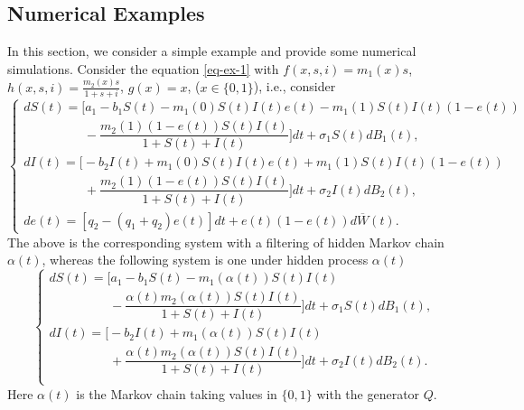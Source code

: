 \documentclass[12pt]{amsart}
\theoremstyle{remark}
\numberwithin{equation}{section}
\numberwithin{equation}{section}
\newcommand{\1}{\boldsymbol{1}}
\def\bar{\overline}
\begin{document}
\subsection{Numerical Examples}\label{sec:num}
In this section, we consider a simple example and provide some numerical simulations.
Consider the equation \eqref{eq-ex-1} with $f(x,s,i)=m_1(x)s$,
 $h(x,s,i)=\frac{m_2(x)s}{1+s+i}$, $g(x)=x$, ($x\in\{0,1\}$), i.e., consider
\begin{equation}\label{eq-ex-2}
\begin{cases}
dS(t)=\Big[a_1-b_1S(t)-m_1(0)S(t)I(t)e(t)-m_1(1)S(t)I(t)(1-e(t))
\\
\hspace{2cm}-\dfrac{m_2(1)(1-e(t))S(t)I(t)}{1+S(t)+I(t)}\Big]dt + \sigma_1 S(t) dB_1(t),\\[2ex]
dI(t)=\Big[-b_2I(t) + m_1(0)S(t)I(t)e(t)+m_1(1)S(t)I(t)(1-e(t))\\
\hspace{2cm}+\dfrac{m_2(1)(1-e(t))S(t)I(t)}{1+S(t)+I(t)}\Big]dt + \sigma_2I(t) dB_2(t),\\
de(t)=[q_2-(q_1+q_2)e(t)]dt+e(t)(1-e(t))d\bar W(t).
\end{cases}
\end{equation}
The above is the corresponding system
with a filtering of hidden Markov chain $\alpha(t)$, whereas
the following
system is one under hidden process $\alpha(t)$
\begin{equation}\label{eq-ex-3}
\begin{cases}
dS(t)=\Big[a_1-b_1S(t)-m_1(\alpha(t))S(t)I(t)\\
\hspace{2cm}-\dfrac{\alpha(t)m_2(\alpha(t))S(t)I(t)}{1+S(t)+I(t)}\Big]dt + \sigma_1 S(t) dB_1(t),\\[2ex]
dI(t)=\Big[-b_2I(t) + m_1(\alpha(t))S(t)I(t)\\
\hspace{2cm}+\dfrac{\alpha(t)m_2(\alpha(t))S(t)I(t)}{1+S(t)+I(t)}\Big]dt + \sigma_2I(t) dB_2(t).\\
\end{cases}
\end{equation}
Here $\alpha(t)$ is the Markov chain taking values in $\{0,1\}$ with the generator $Q$.
\end{document}
